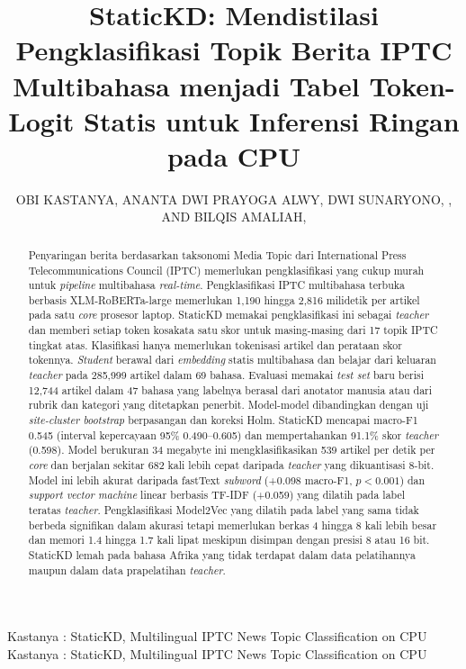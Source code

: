 \documentclass{ieeeaccess}
\newcommand{\en}[1]{\textit{#1}}
\begin{document}
\def\theyear{2026}

\title{StaticKD: Mendistilasi Pengklasifikasi Topik Berita IPTC Multibahasa menjadi Tabel Token-Logit Statis untuk Inferensi Ringan pada CPU}

\author{\uppercase{Obi Kastanya}, \uppercase{Ananta Dwi Prayoga Alwy}, \uppercase{Dwi Sunaryono}, , AND \uppercase{Bilqis Amaliah}, }
\address[1]{Departemen Teknik Informatika, Institut Teknologi Sepuluh Nopember, Surabaya, Indonesia (e-mail: 6025252015@student.its.ac.id; 6025252007@student.its.ac.id; dwi.syn@its.ac.id; bilqis@if.its.ac.id)}

\markboth
{Kastanya \headeretal: StaticKD, Multilingual IPTC News Topic Classification on CPU}
{Kastanya \headeretal: StaticKD, Multilingual IPTC News Topic Classification on CPU}


\begin{abstract}
Penyaringan berita berdasarkan taksonomi Media Topic dari International Press Telecommunications Council (IPTC) memerlukan pengklasifikasi yang cukup murah untuk \en{pipeline} multibahasa \en{real-time}. Pengklasifikasi IPTC multibahasa terbuka berbasis XLM-RoBERTa-large memerlukan 1,190 hingga 2,816 milidetik per artikel pada satu \en{core} prosesor laptop. StaticKD memakai pengklasifikasi ini sebagai \en{teacher} dan memberi setiap token kosakata satu skor untuk masing-masing dari 17 topik IPTC tingkat atas. Klasifikasi hanya memerlukan tokenisasi artikel dan perataan skor tokennya. \en{Student} berawal dari \en{embedding} statis multibahasa dan belajar dari keluaran \en{teacher} pada 285,999 artikel dalam 69 bahasa. Evaluasi memakai \en{test set} baru berisi 12,744 artikel dalam 47 bahasa yang labelnya berasal dari anotator manusia atau dari rubrik dan kategori yang ditetapkan penerbit. Model-model dibandingkan dengan uji \en{site-cluster bootstrap} berpasangan dan koreksi Holm. StaticKD mencapai macro-F1 0.545 (interval kepercayaan 95\% 0.490--0.605) dan mempertahankan 91.1\% skor \en{teacher} (0.598). Model berukuran 34 megabyte ini mengklasifikasikan 539 artikel per detik per \en{core} dan berjalan sekitar 682 kali lebih cepat daripada \en{teacher} yang dikuantisasi 8-bit. Model ini lebih akurat daripada fastText \en{subword} (+0.098 macro-F1, $p<0.001$) dan \en{support vector machine} linear berbasis TF-IDF (+0.059) yang dilatih pada label teratas \en{teacher}. Pengklasifikasi Model2Vec yang dilatih pada label yang sama tidak berbeda signifikan dalam akurasi tetapi memerlukan berkas 4 hingga 8 kali lebih besar dan memori 1.4 hingga 1.7 kali lipat meskipun disimpan dengan presisi 8 atau 16 bit. StaticKD lemah pada bahasa Afrika yang tidak terdapat dalam data pelatihannya maupun dalam data prapelatihan \en{teacher}.
\end{abstract}
\end{document}
